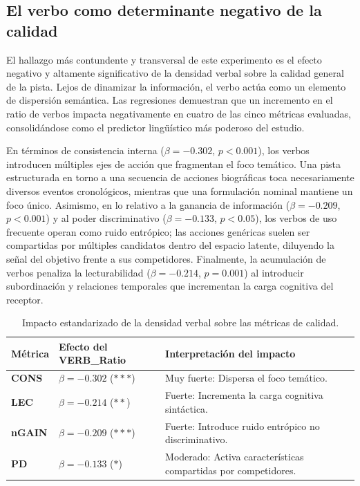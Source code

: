 \documentclass[../main.tex]{subfiles}
\begin{document}
\subsection{El verbo como determinante negativo de la calidad}

El hallazgo más contundente y transversal de este experimento es el efecto negativo y altamente significativo de la densidad verbal sobre la calidad general de la pista. Lejos de dinamizar la información, el verbo actúa como un elemento de dispersión semántica. Las regresiones demuestran que un incremento en el ratio de verbos impacta negativamente en cuatro de las cinco métricas evaluadas, consolidándose como el predictor lingüístico más poderoso del estudio.

En términos de consistencia interna ($\beta = -0.302$, $p < 0.001$), los verbos introducen múltiples ejes de acción que fragmentan el foco temático. Una pista estructurada en torno a una secuencia de acciones biográficas toca necesariamente diversos eventos cronológicos, mientras que una formulación nominal mantiene un foco único. Asimismo, en lo relativo a la ganancia de información ($\beta = -0.209$, $p < 0.001$) y al poder discriminativo ($\beta = -0.133$, $p < 0.05$), los verbos de uso frecuente operan como ruido entrópico; las acciones genéricas suelen ser compartidas por múltiples candidatos dentro del espacio latente, diluyendo la señal del objetivo frente a sus competidores. Finalmente, la acumulación de verbos penaliza la lecturabilidad ($\beta = -0.214$, $p = 0.001$) al introducir subordinación y relaciones temporales que incrementan la carga cognitiva del receptor.

\begin{table}[H]
\centering
\begin{tabular}{llp{7.5cm}}
\hline
\textbf{Métrica} & \textbf{Efecto del VERB\_Ratio} & \textbf{Interpretación del impacto} \\
\hline
\textbf{CONS} & $\beta = -0.302$ ($***$) & Muy fuerte: Dispersa el foco temático. \\
\textbf{LEC} & $\beta = -0.214$ ($**$) & Fuerte: Incrementa la carga cognitiva sintáctica. \\
\textbf{nGAIN} & $\beta = -0.209$ ($***$) & Fuerte: Introduce ruido entrópico no discriminativo. \\
\textbf{PD} & $\beta = -0.133$ ($*$) & Moderado: Activa características compartidas por competidores. \\
\hline
\end{tabular}
\caption{Impacto estandarizado de la densidad verbal sobre las métricas de calidad.}
\label{tab:verb_impact}
\end{table}
\end{document}
